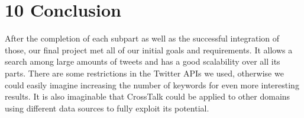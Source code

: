 \chapter*{10    Conclusion}
\setcounter{chapter}{10}
\setcounter{section}{0}

After the completion of each subpart as well as the successful integration of those, our final project met all of our initial goals and requirements. It allows a search among large amounts of tweets and has a good scalability over all its parts. There are some restrictions in the Twitter APIs we used, otherwise we could easily imagine increasing the number of keywords for even more interesting results. It is also imaginable that CrossTalk could be applied to other domains using different data sources to fully exploit its potential.
